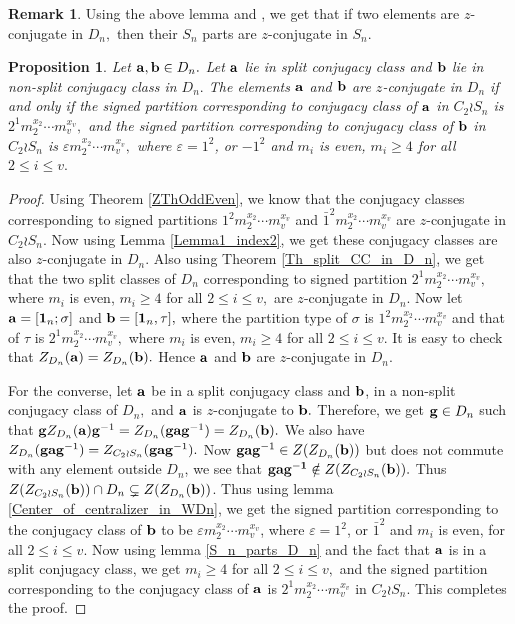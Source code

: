 \documentclass[12pt,twoside,reqno]{amsart}
\newtheorem{proposition}[theorem]{Proposition}
\theoremstyle{definition}
\newtheorem{remark}[theorem]{Remark}
\numberwithin{equation}{section}
\begin{document}
 \begin{remark}
 Using the above lemma and \cite[Th. 1.1]{BKS:2019}, we get that if two elements are $z$-conjugate in $D_n,$ then their $S_n$ parts are $z$-conjugate in $S_n.$
 \end{remark}

 \begin{proposition}\label{Split_and_non-split_in_D_n}
Let ${\bf a}, {\bf b} \in D_n.$ Let ${\bf a}$ lie in split conjugacy class and ${\bf b}$ lie in non-split conjugacy class in $D_n.$ The elements ${\bf a}$ and ${\bf b}$ are $z$-conjugate in $D_n$ if and only if the signed partition corresponding to conjugacy class of ${\bf a}$ in $C_2 \wr S_n$ is $2^1m_2^{x_2}\cdots m_v^{x_v},$ and the signed partition corresponding to conjugacy class of ${\bf b}$ in $C_2 \wr S_n$ is $\varepsilon m_2^{x_2}\cdots m_v^{x_v},$ where $\varepsilon = { 1}^2$, or ${ -1}^2$ and $m_i$ is even, $m_i\geq 4$ for all $2\leq i \leq v.$ 
 \end{proposition}
\begin{proof}
    Using Theorem \ref{ZThOddEven}, we know that the conjugacy classes corresponding to signed partitions ${ 1}^2m_2^{x_2}\cdots m_v^{x_v}$ and $\bar{1}^2m_2^{x_2}\cdots m_v^{x_v}$ are $z$-conjugate in $C_2 \wr S_n.$ Now using Lemma \ref{Lemma1_index2}, we get these conjugacy classes are also $z$-conjugate in $D_n.$ Also using Theorem \ref{Th_split_CC_in_D_n}, we get that the two split classes of $D_n$ corresponding to signed partition $2^1m_2^{x_2}\cdots m_v^{x_v},$ where $m_i$ is even, $m_i\geq 4$ for all $2\leq i \leq v,$ are $z$-conjugate in $D_n.$ Now let ${\bf a}=[{\bf 1}_n ; \sigma]$ and ${\bf b}=[{\bf 1}_n,\tau],$ where the partition type of $\sigma$ is  ${1}^2m_2^{x_2}\cdots m_v^{x_v}$ and that of $\tau$ is 
    $2^1m_2^{x_2}\cdots m_v^{x_v},$ where  $m_i$ is even, $m_i\geq 4$ for all $2\leq i \leq v.$ It is easy to check that $Z_{D_n}({\bf a})=Z_{D_n}({\bf b}).$ Hence ${\bf a}$ and ${\bf b}$ are $z$-conjugate in $D_n.$

    For the converse, let ${\bf a}$ be in a split conjugacy class and ${\bf b}$, in a non-split conjugacy class of $D_n,$ and ${\bf a} $ is $z$-conjugate to ${\bf b}.$ Therefore, we get ${\bf g}\in D_n$ such that ${\bf g}Z_{D_n}({\bf a}){\bf g}^{-1}=Z_{D_n}({\bf gag}^{-1})=Z_{D_n}({\bf b}).$ We also have $Z_{D_n}({\bf gag}^{-1}) = Z_{C_2 \wr S_n}({\bf gag}^{-1}).$ Now ${\bf gag}^{-1} \in Z(Z_{D_n}({\bf b}))$ but does not commute with any element outside $D_n$, we see that ${\bf gag^{-1}} \notin Z(Z_{C_2 \wr S_n}({\bf b})).$ Thus $Z(Z_{C_2 \wr S_n}({\bf b})) \cap D_n \subsetneq Z(Z_{D_n}({\bf b}))$. Thus using lemma \ref{Center_of_centralizer_in_WDn}, we get the signed partition corresponding to the conjugacy class of ${\bf b}$ to be  $\varepsilon m_2^{x_2}\cdots m_v^{x_v}$, where $\varepsilon = {1}^2$, or $\bar{1}^2$ and $m_i$ is even, for all $2\leq i \leq v.$ Now using lemma \ref{S_n_parts_D_n} and the fact that ${\bf a}$ is in a split conjugacy class, we get $m_i\geq 4$ for all $2\leq i \leq v,$ and the signed partition corresponding to the conjugacy class of ${\bf a}$ is $2^1m_2^{x_2}\cdots m_v^{x_v}$ in $C_2 \wr S_n.$ This completes the proof. 
\end{proof}
\end{document}
